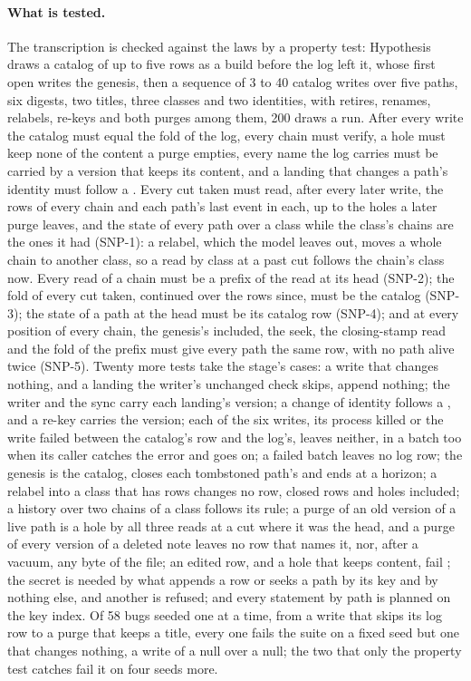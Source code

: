 \documentclass[11pt]{article}
\theoremstyle{plain}
\theoremstyle{definition}
\newcommand{\lean}[1]{\path{#1}}
\begin{document}
\paragraph{What is tested.}
The transcription is checked against the laws by a property test: Hypothesis draws a catalog of up
to five rows as a build before the log left it, whose first open writes the genesis, then a
sequence of 3 to 40 catalog writes over five paths, six digests, two titles, three classes and two
identities, with retires, renames, relabels, re-keys and both purges among them, 200 draws a run.
After every write the catalog must equal the fold of the log, every chain must verify, a hole must
keep none of the content a purge empties, every name the log carries must be carried by a version
that keeps its content, and a landing that changes a path's identity must follow a \lean{move}.
Every cut taken must read, after every later write, the rows of every chain and each path's last
event in each, up to the holes a later purge leaves, and the state of every path over a class
while the class's chains are the ones it had (SNP-1): a relabel, which the model leaves out, moves
a whole chain to another class, so a read by class at a past cut follows the chain's class now.
Every read of a chain must be a prefix of the read at its head (SNP-2); the fold of every cut
taken, continued over the rows since, must be the catalog (SNP-3); the state of a path at the head
must be its catalog row (SNP-4); and at every position of every chain, the genesis's included, the
seek, the closing-stamp read and the fold of the prefix must give every path the same row, with no
path alive twice (SNP-5). Twenty more tests take the stage's cases: a write that changes nothing,
and a landing the writer's unchanged check skips, append nothing; the writer and the sync carry
each landing's version; a change of identity follows a \lean{move}, and a re-key carries the
version; each of the six writes, its process killed or the write failed between the catalog's row
and the log's, leaves neither, in a batch too when its caller catches the error and goes on; a
failed batch leaves no log row; the genesis is the catalog, closes each tombstoned path's
\lean{store} and ends at a horizon; a relabel into a class that has rows changes no row, closed
rows and holes included; a history over two chains of a class follows its rule; a purge of an old
version of a live path is a hole by all three reads at a cut where it was the head, and a purge of
every version of a deleted note leaves no row that names it, nor, after a vacuum, any byte of the
file; an edited row, and a hole that keeps content, fail \lean{verify}; the secret is needed by
what appends a row or seeks a path by its key and by nothing else, and another is refused; and
every statement by path is planned on the key index. Of 58 bugs seeded one at a time, from a
write that skips its log row to a purge that keeps a title, every one fails the suite on a fixed
seed but one that changes nothing, a write of a null over a null; the two that only the property
test catches fail it on four seeds more.
\end{document}
